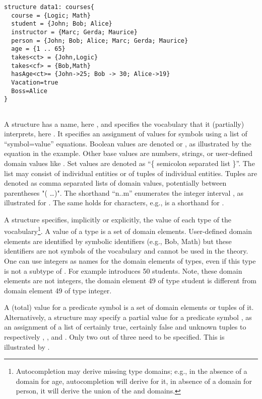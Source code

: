 \begin{lstlisting}
structure data1: courses{
  course = {Logic; Math}
  student = {John; Bob; Alice}
  instructor = {Marc; Gerda; Maurice}
  person = {John; Bob; Alice; Marc; Gerda; Maurice}
  age = {1 .. 65}
  takes<ct> = {John,Logic}
  takes<cf> = {Bob,Math}
  hasAge<ct>= {John->25; Bob -> 30; Alice->19}
  Vacation=true
  Boss=Alice
}


\end{lstlisting}
A structure has a name, here , and specifies the  vocabulary that it (partially) interprets, here . It specifies an assignment of values for symbols using  a list of ``symbol=value'' equations. Boolean values are denoted  or  , as illustrated by the equation  in the example. Other base values are numbers, strings, or user-defined domain values like .  Set values are denoted as ``\{ semicolon separated list \}''. The list may consist of individual entities or of  tuples of individual entities. Tuples are denoted as comma separated lists of domain values, potentially between parentheses "( \dots )". The shorthand ``n..m''  enumerates the integer interval ,  as illustrated  for . The same holds for characters, e.g.,  is a shorthand for .



A structure specifies, implicitly or explicitly, the value of each
type of the vocabulary\footnote{Autocompletion may derive missing type
  domains; e.g., in the absence of a domain for age, autocompletion
  will derive  for it, in absence of a domain for
  person, it will derive the union of the  and
   domains.}. A value of a type is a set of domain
elements. User-defined domain elements are identified by symbolic identifiers
(e.g., Bob, Math) but these identifiers are not symbols of the
vocabulary and cannot be used in the
theory.  One can use integers as names for the domain elements of types, even
if this type is not a subtype of . For example  introduces 50 students.  Note, these domain elements are
not integers, the domain element 49 of type student is different from
domain element 49 of type integer.

A (total) value for a predicate symbol is a set of domain elements or tuples of it. Alternatively, a structure may  specify a partial value for a predicate symbol , as an assignment of a list of certainly true, certainly false and unknown tuples to respectively , , and . Only two out of   three need to be specified. This is illustrated by .

